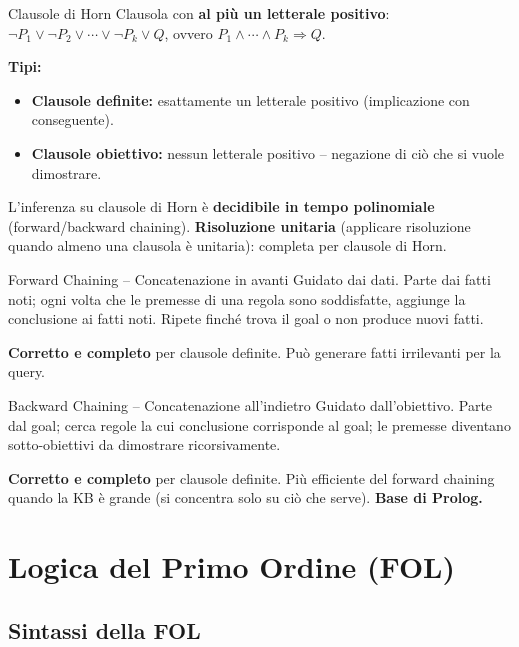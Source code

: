 \documentclass[12pt,a4paper]{article}
\begin{document}
\begin{defbox}{Clausole di Horn}
Clausola con \textbf{al più un letterale positivo}: $\neg P_1 \lor \neg P_2 \lor \cdots \lor \neg P_k \lor Q$, ovvero $P_1 \land \cdots \land P_k \Rightarrow Q$.

\textbf{Tipi:}
\begin{itemize}[noitemsep]
  \item \textbf{Clausole definite:} esattamente un letterale positivo (implicazione con conseguente).
  \item \textbf{Clausole obiettivo:} nessun letterale positivo -- negazione di ciò che si vuole dimostrare.
\end{itemize}
L'inferenza su clausole di Horn è \textbf{decidibile in tempo polinomiale} (forward/backward chaining). \textbf{Risoluzione unitaria} (applicare risoluzione quando almeno una clausola è unitaria): completa per clausole di Horn.
\end{defbox}

\begin{thmbox}{Forward Chaining -- Concatenazione in avanti}
Guidato dai dati. Parte dai fatti noti; ogni volta che le premesse di una regola sono soddisfatte, aggiunge la conclusione ai fatti noti. Ripete finché trova il goal o non produce nuovi fatti.

\textbf{Corretto e completo} per clausole definite. Può generare fatti irrilevanti per la query.
\end{thmbox}

\begin{thmbox}{Backward Chaining -- Concatenazione all'indietro}
Guidato dall'obiettivo. Parte dal goal; cerca regole la cui conclusione corrisponde al goal; le premesse diventano sotto-obiettivi da dimostrare ricorsivamente.

\textbf{Corretto e completo} per clausole definite. Più efficiente del forward chaining quando la KB è grande (si concentra solo su ciò che serve). \textbf{Base di Prolog.}
\end{thmbox}

\section{Logica del Primo Ordine (FOL)}

\subsection{Sintassi della FOL}
\end{document}

